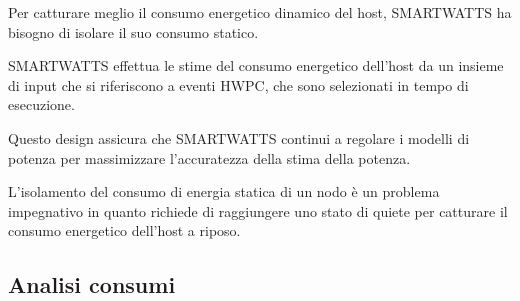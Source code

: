 \documentclass[a4paper, 11pt]{article}
\begin{document}
Per catturare meglio il consumo energetico dinamico del host, SMARTWATTS ha bisogno di isolare il suo consumo statico.

SMARTWATTS effettua le stime del consumo energetico dell'host da un insieme di input che si riferiscono a eventi HWPC, che sono selezionati in tempo di esecuzione.

Questo design assicura che SMARTWATTS continui a regolare i
modelli di potenza per massimizzare l'accuratezza della stima della potenza.

L'isolamento del consumo di energia statica di un nodo è un
problema impegnativo in quanto richiede di raggiungere uno stato di quiete per catturare il consumo energetico dell'host a riposo.


\subsection{Analisi consumi}
\end{document}
